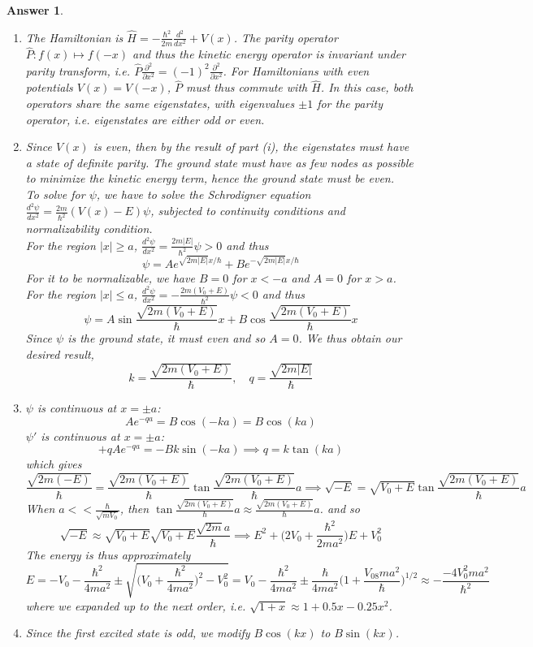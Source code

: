 \documentclass[a4paper]{article}
\newtheorem{ans}{Answer}[subsection]
\theoremstyle{new}
\begin{document}
\begin{ans}\leavevmode
\begin{enumerate}[label=(\roman*)]
\item The Hamiltonian is $\hat{H}=-\frac{\hbar^2}{2m}\frac{d^2}{dx^2}+V(x)$. The parity operator $\hat{P}:f(x)\mapsto f(-x)$ and thus the kinetic energy operator is invariant under parity transform, i.e. $\hat{P}\frac{\partial^2}{\partial x^2}=(-1)^2\frac{\partial^2}{\partial x^2}$. For Hamiltonians with even potentials $V(x)=V(-x)$, $\hat{P}$ must thus commute with $\hat{H}$. In this case, both operators share the same eigenstates, with eigenvalues $\pm1$ for the parity operator, i.e. eigenstates are either odd or even.
\item Since $V(x)$ is even, then by the result of part (i), the eigenstates must have a state of definite parity. The ground state must have as few nodes as possible to minimize the kinetic energy term, hence the ground state must be even.\\[5pt]
To solve for $\psi$, we have to solve the Schrodigner equation $\frac{d^2\psi}{dx^2}=\frac{2m}{\hbar^2}(V(x)-E)\psi$, subjected to continuity conditions and normalizability condition.\\[5pt]
For the region $|x|\geq a$, $\frac{d^2\psi}{dx^2}=\frac{2m|E|}{\hbar^2}\psi>0$ and thus 
$$\psi=Ae^{\sqrt{2m|E|}x/\hbar}+Be^{-\sqrt{2m|E|}x/\hbar}$$
For it to be normalizable, we have $B=0$ for $x<-a$ and $A=0$ for $x>a$.\\[5pt]
For the region $|x|\leq a$, $\frac{d^2\psi}{dx^2}=-\frac{2m(V_0+E)}{\hbar^2}\psi<0$ and thus 
$$\psi=A\sin\frac{\sqrt{2m(V_0+E)}}{\hbar}x+B\cos\frac{\sqrt{2m(V_0+E)}}{\hbar}x$$ Since $\psi$ is the ground state, it must even and so $A=0$. We thus obtain our desired result,
$$k=\frac{\sqrt{2m(V_0+E)}}{\hbar},\quad q=\frac{\sqrt{2m|E|}}{\hbar}$$
\item $\psi$ is continuous at $x=\pm a$: 
$$Ae^{-qa}=B\cos(-ka)=B\cos(ka)$$
$\psi'$ is continuous at $x=\pm a$: 
$$+qAe^{-qa}=-Bk\sin(-ka)\implies q=k\tan(ka)$$
which gives
$$\frac{\sqrt{2m(-E)}}{\hbar}=\frac{\sqrt{2m(V_0+E)}}{\hbar}\tan\frac{\sqrt{2m(V_0+E)}}{\hbar}a\implies\sqrt{-E}=\sqrt{V_0+E}\tan\frac{\sqrt{2m(V_0+E)}}{\hbar}a$$
When $a<<\frac{\hbar}{\sqrt{mV_0}}$, then $\tan\frac{\sqrt{2m(V_0+E)}}{\hbar}a\approx \frac{\sqrt{2m(V_0+E)}}{\hbar}a$. and so
$$\sqrt{-E}\approx\sqrt{V_0+E}\sqrt{V_0+E}\frac{\sqrt{2m}a}{\hbar}\implies E^2+\bigg(2V_0+\frac{\hbar^2}{2ma^2}\bigg)E+V_0^2$$
The energy is thus approximately
$$E=-V_0-\frac{\hbar^2}{4ma^2}\pm\sqrt{\bigg(V_0+\frac{\hbar^2}{4ma^2}\bigg)^2-V_0^2}=V_0-\frac{\hbar^2}{4ma^2}\pm\frac{\hbar}{4ma^2}\bigg(1+\frac{V_08ma^2}{\hbar}\bigg)^{1/2}\approx -\frac{-4V_0^2ma^2}{\hbar^2}$$
where we expanded up to the next order, i.e. $\sqrt{1+x}\approx 1+0.5x-0.25x^2$.
\item Since the first excited state is odd, we modify $B\cos(kx)$ to $B\sin(kx)$.
\end{enumerate}
\end{ans}
\end{document}
